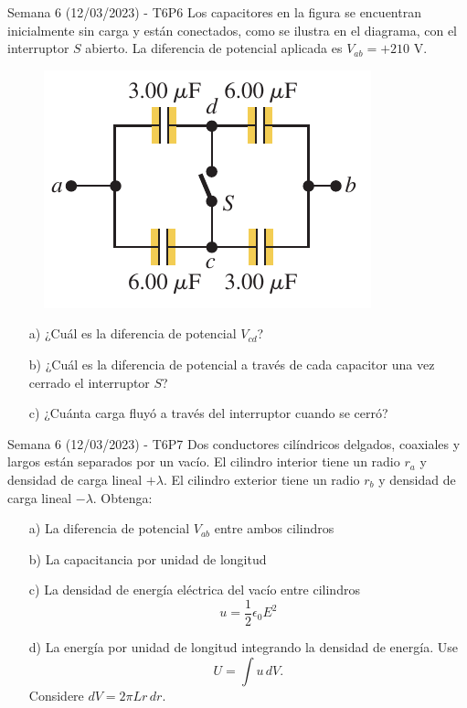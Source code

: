 \begin{frame}{Semana 6 (12/03/2023) - T6P6}
    Los capacitores en la figura se encuentran inicialmente sin carga y están conectados, como se ilustra en el diagrama, con el interruptor $S$ abierto. La diferencia de potencial aplicada es $V_{ab} = +210 \text{ V}$.

    \begin{figure}[H]
        \centering
        \includegraphics[scale=0.4]{figures/t6p6.png}
    \end{figure}
    
    \begin{itemize}
        \item[a)] ¿Cuál es la diferencia de potencial $V_{cd}$?
        \item[b)] ¿Cuál es la diferencia de potencial a través de cada capacitor una vez cerrado el interruptor $S$?
        \item[c)] ¿Cuánta carga fluyó a través del interruptor cuando se cerró?
    \end{itemize}
    
\end{frame}

\begin{frame}{Semana 6 (12/03/2023) - T6P7}
    Dos conductores cilíndricos delgados, coaxiales y largos están separados por un vacío. El cilindro interior tiene un radio $r_a$ y densidad de carga lineal $+\lambda$. El cilindro exterior tiene un radio $r_b$ y densidad de carga lineal $-\lambda$. Obtenga:
    
    \begin{itemize}
        \item[a)] La diferencia de potencial $V_{ab}$ entre ambos cilindros 
        \item[b)] La capacitancia por unidad de longitud
        \item[c)] La densidad de energía eléctrica del vacío entre cilindros $$u=\frac{1}{2}\epsilon_0 E^2$$
        \item[d)] La energía por unidad de longitud integrando la densidad de energía. Use $$U=\int u\, dV.$$ Considere $dV=2\pi Lr\,dr$.
    \end{itemize}
\end{frame}

